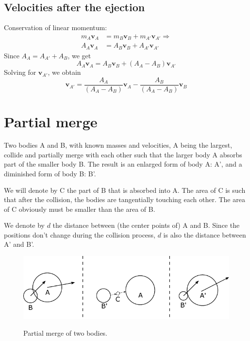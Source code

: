 \documentclass{article}
\newcommand{\vbs}[0]{\boldsymbol{v}}
\begin{document}
\subsection{Velocities after the ejection}

Conservation of linear momentum:
\begin{equation*}
\begin{split}
m_A\vbs_A &= m_B\vbs_B + m_{A'}\vbs_{A'}
\Rightarrow
\\A_A\vbs_A &= A_B\vbs_B + A_{A'}\vbs_{A'}
\end{split}
\end{equation*}
Since $A_A = A_{A'} + A_B$, we get
\begin{equation*}
A_A\vbs_A = A_B\vbs_B + (A_A - A_B)\vbs_{A'}
\end{equation*}
Solving for $\vbs_{A'}$, we obtain
\begin{equation}
\vbs_{A'} = \frac{A_A}{(A_A - A_B)}\vbs_A - \frac{A_B}{(A_A - A_B)}\vbs_B
\end{equation}







\section{Partial merge}
Two bodies A and B, with known masses and velocities, A being the largest, collide and partially merge with each other such that the larger body A absorbs part of the smaller body B. The result is an enlarged form of body A: A', and a diminished form of body B: B'.

We will denote by C the part of B that is absorbed into A. The area of C is such that after the collision, the bodies are tangentially touching each other. The area of C obviously must be smaller than the area of B.

We denote by $d$ the distance between (the center points of) A and B. Since the positions don't change during the collision process, $d$ is also the distance between A' and B'.

\begin{figure}[h]
	\centering
	{\includegraphics{figures/partial_merge.pdf}}
	\caption{Partial merge of two bodies.}\label{fig:partial_merge}
\end{figure}
\end{document}
